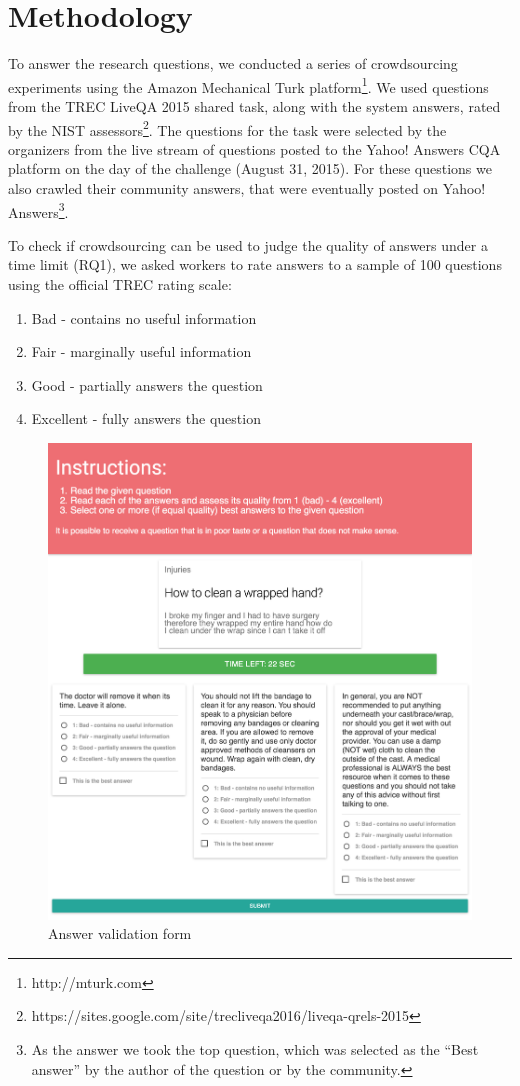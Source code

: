 \documentclass[11pt,letterpaper]{article}
\begin{document}
\section{Methodology}
\label{sec:methodology}

To answer the research questions, we conducted a series of crowdsourcing experiments using the Amazon Mechanical Turk platform\footnote{http://mturk.com}.
We used questions from the TREC LiveQA 2015 shared task, along with the system answers, rated by the NIST assessors\footnote{https://sites.google.com/site/trecliveqa2016/liveqa-qrels-2015}.
The questions for the task were selected by the organizers from the live stream of questions posted to the Yahoo! Answers CQA platform on the day of the challenge (August 31, 2015).
For these questions we also crawled their community answers, that were eventually posted on Yahoo! Answers\footnote{As the answer we took the top question, which was selected as the ``Best answer'' by the author of the question or by the community.}.

To check if crowdsourcing can be used to judge the quality of answers under a time limit (RQ1), we asked workers to rate answers to a sample of 100 questions using the official TREC rating scale:
\vspace{-0.3cm}
\begin{enumerate}
\setlength{\itemsep}{0pt}
\setlength{\parskip}{0pt}
\item Bad - contains no useful information
\item Fair - marginally useful information
\item Good - partially answers the question
\item Excellent - fully answers the question
\end{enumerate}

\begin{figure}[h!]
\centering
\includegraphics[width=0.9\linewidth]{img/validation_screenshot}
\caption{Answer validation form}
\label{fig:interfaces:validation}
\end{figure}
\end{document}
